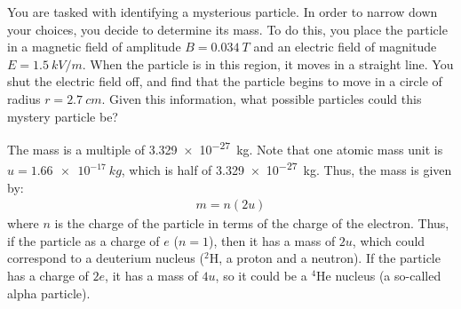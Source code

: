\question You are tasked with identifying a mysterious particle. In order to narrow down your choices, you decide to determine its mass. To do this, you place the particle in a magnetic field of amplitude $B = \SI{0.034}{T}$ and an electric field of magnitude $E = \SI{1.5}{kV/m}$. When the particle is in this region, it moves in a straight line. You shut the electric field off, and find that the particle begins to move in a circle of radius $r = \SI{2.7}{cm}$. Given this information, what possible particles could this mystery particle be?
\begin{finalanswer}
The mass is a multiple of \SI{3.329e-27}{kg}. Note that one atomic mass unit is $u=\SI{1.66e-17}{kg}$, which is half of \SI{3.329e-27}{kg}. Thus, the mass is given by:
\begin{align*}
m=n (2u)
\end{align*}
where $n$ is the charge of the particle in terms of the charge of the electron. Thus, if the particle as a charge of $e$ ($n=1$), then it has a mass of $2u$, which could correspond to a deuterium nucleus ($^2$H, a proton and a neutron). If the particle has a charge of $2e$, it has a mass of $4u$, so it could be a $^4$He nucleus (a so-called alpha particle).
\end{finalanswer}
